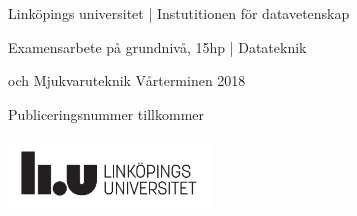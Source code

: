 \begin{titlepage}
	\vspace{10em}
\begin{minipage}{.85\linewidth}
\begin{center}Linköpings universitet | Instutitionen för datavetenskap\par%
Examensarbete på grundnivå, 15hp | Datateknik\par%
och Mjukvaruteknik Vårterminen 2018 \par
Publiceringsnummer tillkommer

	\includegraphics[width=0.4\textwidth]{../Templates/liu_primary_black_sv.pdf}\\[2cm] %

\end{center}
\end{minipage}

	~

	\vfill\vfill



	\vfill %

\end{titlepage}


